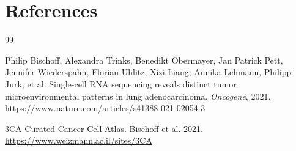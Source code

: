 \documentclass[11pt,a4paper]{article}
\begin{document}
\section{References}

\begin{thebibliography}{99}

Philip Bischoff, Alexandra Trinks, Benedikt Obermayer, Jan Patrick Pett, Jennifer Wiederspahn, Florian Uhlitz, Xizi Liang, Annika Lehmann, Philipp Jurk, et al.
\newblock Single-cell RNA sequencing reveals distinct tumor microenvironmental patterns in lung adenocarcinoma.
\newblock \textit{Oncogene}, 2021.
\newblock \url{https://www.nature.com/articles/s41388-021-02054-3}

3CA Curated Cancer Cell Atlas.
\newblock Bischoff et al. 2021.
\newblock \url{https://www.weizmann.ac.il/sites/3CA}

\end{thebibliography}
\end{document}
